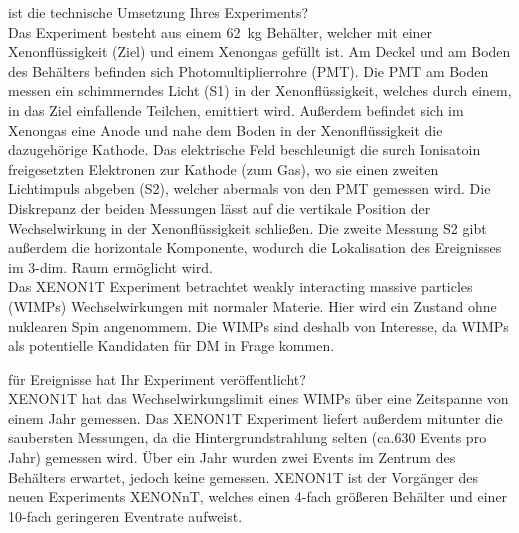     \justifying ist die technische Umsetzung Ihres Experiments?\\
    Das Experiment besteht aus einem \SI{62}{\kilo\gram} Behälter, welcher mit einer Xenonflüssigkeit (Ziel) und einem Xenongas gefüllt ist. Am Deckel und am Boden des
    Behälters befinden sich Photomultiplierrohre (PMT). Die PMT am Boden messen ein schimmerndes Licht (S1) in der Xenonflüssigkeit, welches durch einem, in das Ziel einfallende 
    Teilchen, emittiert wird. Außerdem befindet sich im Xenongas eine Anode und nahe dem Boden in der Xenonflüssigkeit die dazugehörige Kathode. Das elektrische Feld beschleunigt 
    die surch Ionisatoin freigesetzten Elektronen zur Kathode (zum Gas), wo sie einen zweiten Lichtimpuls abgeben (S2), welcher abermals von den PMT gemessen wird. Die Diskrepanz der beiden Messungen lässt auf 
    die vertikale Position der Wechselwirkung in der Xenonflüssigkeit schließen. Die zweite Messung S2 gibt außerdem die horizontale Komponente, wodurch die Lokalisation des 
    Ereignisses im 3-dim. Raum ermöglicht wird.\\
    Das XENON1T Experiment betrachtet weakly interacting massive particles (WIMPs) Wechselwirkungen mit normaler Materie. Hier wird ein Zustand ohne nuklearen Spin angenommem. 
    Die WIMPs sind deshalb von Interesse, da WIMPs als potentielle Kandidaten für DM in Frage kommen. 

    \justifying für Ereignisse hat Ihr Experiment veröffentlicht?\\
    XENON1T hat das Wechselwirkungslimit eines WIMPs über eine Zeitspanne von einem Jahr gemessen. Das XENON1T Experiment liefert außerdem mitunter die saubersten Messungen, da
    die Hintergrundstrahlung selten (ca.630 Events pro Jahr) gemessen wird. Über ein Jahr wurden zwei Events im Zentrum des Behälters erwartet, jedoch keine gemessen. XENON1T 
    ist der Vorgänger des neuen Experiments XENONnT, welches einen 4-fach größeren Behälter und einer 10-fach geringeren Eventrate aufweist.

